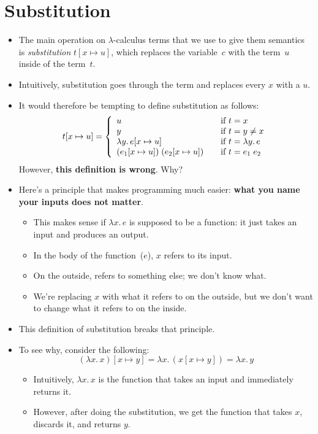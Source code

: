 \documentclass{lecturenotes}
\newcommand{\abs}[2]{\ensuremath{\lambda #1.\,#2}}
\newcommand{\app}[2]{\ensuremath{#1\;#2}}
\begin{document}
\section{Substitution}
\label{sec:substitution}
\begin{itemize}
\item The main operation on $\lambda$-calculus terms that we use to give them semantics is \emph{substitution} $t[x \mapsto u]$, which replaces the variable~$c$ with the term~$u$ inside of the term~$t$.
\item Intuitively, substitution goes through the term and replaces every $x$ with a $u$.
\item It would therefore be tempting to define substitution as follows:
  $$
  t[x \mapsto u] = \left\{
    \begin{array}{l@{\hspace{2em}\text{if}~}l}
      u & t = x \\
      y & t = y \neq x\\
      \abs{y}{e[x\mapsto u]} & t = \abs{y}{e}\\
      \app{(e_1[x\mapsto u])}{(e_2[x \mapsto u])} & t = \app{e_1}{e_2}
    \end{array}\right.
  $$
  However, \textbf{this definition is wrong}. Why?
\item Here's a principle that makes programming much easier: \textbf{what you name your inputs does not matter}.
  \begin{itemize}
  \item This makes sense if $\abs{x}{e}$ is supposed to be a function: it just takes an input and produces an output.
  \item In the body of the function~($e$), $x$ refers to its input.
  \item On the outside, refers to something else; we don't know what.
  \item We're replacing $x$ with what it refers to on the outside, but we don't want to change what it refers to on the inside.
  \end{itemize}
\item This definition of substitution breaks that principle.
\item To see why, consider the following:
  $$(\abs{x}{x})[x \mapsto y] = \abs{x}{(x [x \mapsto y])} = \abs{x}{y}$$
  \begin{itemize}
  \item Intuitively, $\abs{x}{x}$ is the function that takes an input and immediately returns it.
  \item However, after doing the substitution, we get the function that takes $x$, discards it, and returns $y$.

\end{itemize}
\end{itemize}
\end{document}
